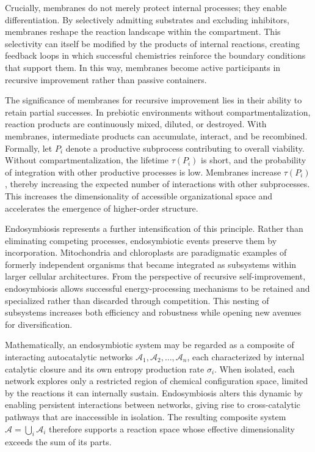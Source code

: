 \documentclass[11pt]{article}
\begin{document}
Crucially, membranes do not merely protect internal processes; they enable differentiation. By selectively admitting substrates and excluding inhibitors, membranes reshape the reaction landscape within the compartment. This selectivity can itself be modified by the products of internal reactions, creating feedback loops in which successful chemistries reinforce the boundary conditions that support them. In this way, membranes become active participants in recursive improvement rather than passive containers.

The significance of membranes for recursive improvement lies in their ability to retain partial successes. In prebiotic environments without compartmentalization, reaction products are continuously mixed, diluted, or destroyed. With membranes, intermediate products can accumulate, interact, and be recombined. Formally, let $P_i$ denote a productive subprocess contributing to overall viability. Without compartmentalization, the lifetime $\tau(P_i)$ is short, and the probability of integration with other productive processes is low. Membranes increase $\tau(P_i)$, thereby increasing the expected number of interactions with other subprocesses. This increases the dimensionality of accessible organizational space and accelerates the emergence of higher-order structure.

Endosymbiosis represents a further intensification of this principle. Rather than eliminating competing processes, endosymbiotic events preserve them by incorporation. Mitochondria and chloroplasts are paradigmatic examples of formerly independent organisms that became integrated as subsystems within larger cellular architectures. From the perspective of recursive self-improvement, endosymbiosis allows successful energy-processing mechanisms to be retained and specialized rather than discarded through competition. This nesting of subsystems increases both efficiency and robustness while opening new avenues for diversification.

Mathematically, an endosymbiotic system may be regarded as a composite of interacting autocatalytic networks $\mathcal{A}_1, \mathcal{A}_2, \dots, \mathcal{A}_n$, each characterized by internal catalytic closure and its own entropy production rate $\sigma_i$. When isolated, each network explores only a restricted region of chemical configuration space, limited by the reactions it can internally sustain. Endosymbiosis alters this dynamic by enabling persistent interactions between networks, giving rise to cross-catalytic pathways that are inaccessible in isolation. The resulting composite system $\mathcal{A} = \bigcup_i \mathcal{A}_i$ therefore supports a reaction space whose effective dimensionality exceeds the sum of its parts.
\end{document}
